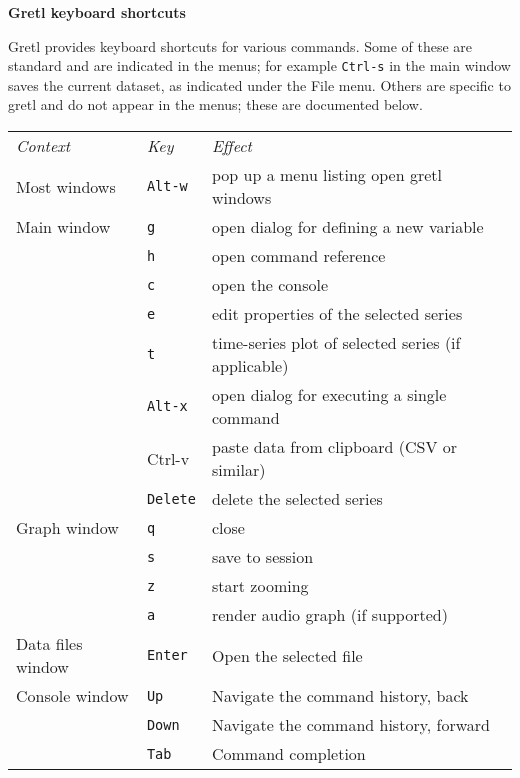 \documentclass{article}
\begin{document}
\setlength{\parindent}{0pt}
\setlength{\parskip}{1ex}
\thispagestyle{empty}

\begin{center}
{\large \textbf{Gretl keyboard shortcuts}}
\end{center}

\textsf{Gretl} provides keyboard shortcuts for various commands. Some of
these are standard and are indicated in the menus; for example
\texttt{Ctrl-s} in the main window saves the current dataset, as
indicated under the \textsf{File} menu. Others are specific to
\textsf{gretl} and do not appear in the menus; these are documented
below.

\begin{center}
\begin{tabular}{p{}lp{}}
\textit{Context} & \textit{Key} & \textit{Effect} \\[6pt]

Most windows & \texttt{Alt-w} & 
  pop up a menu listing open \textsf{gretl} windows \\[6pt]

Main window & \texttt{g} & 
  open dialog for defining a new variable \\
 & \texttt{h} & open command reference \\
 & \texttt{c} & open the console \\
 & \texttt{e} & edit properties of the selected series \\
 & \texttt{t} & time-series plot of selected series (if applicable) \\
 & \texttt{Alt-x} & open dialog for executing a single command \\
 & Ctrl-v & paste data from clipboard (CSV or similar) \\
 & \texttt{Delete} & delete the selected series \\[6pt]

Graph window & \texttt{q} & close \\
 & \texttt{s} & save to session \\
 & \texttt{z} & start zooming \\
 & \texttt{a} & render audio graph (if supported) \\[6pt]

Data files window & \texttt{Enter} & Open the selected file \\[6pt]

Console window & \texttt{Up} & Navigate the command history, back \\
 & \texttt{Down} & Navigate the command history, forward \\
 & \texttt{Tab} & Command completion \\

\end{tabular}
\end{center}
\end{document}

